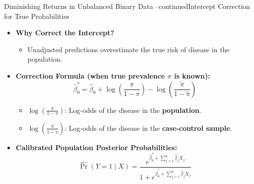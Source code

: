 \documentclass[aspectratio=169, 11pt]{beamer}
\begin{document}
\begin{frame}{Diminishing Returns in Unbalanced Binary Data --continued}{Intercept Correction for True Probabilities}
    \begin{itemize}
        \item \textbf{Why Correct the Intercept?}
        \begin{itemize}
            \item Unadjusted predictions overestimate the true risk of disease in the population.
        \end{itemize}
        \vspace{0.3em}
        \item \textbf{Correction Formula (when true prevalence $\pi$ is known):}
        \[
            \hat{\beta}_{0}^{*} = \hat{\beta}_{0} + \log\left(\frac{\pi}{1-\pi}\right) - \log\left(\frac{\tilde{\pi}}{1-\tilde{\pi}}\right)
        \]
        \begin{itemize}
            \item $\log\left(\frac{\pi}{1-\pi}\right)$: Log-odds of the disease in the \textbf{population}.
            \item $\log\left(\frac{\tilde{\pi}}{1-\tilde{\pi}}\right)$: Log-odds of the disease in the \textbf{case-control sample}.
        \end{itemize}
        \vspace{0.3em}
        \item \textbf{Calibrated Population Posterior Probabilities:}
        \[
            \widehat{\Pr}(Y=1 \mid X) = \frac{e^{\hat{\beta}_{0}^{*} + \sum_{j=1}^p \hat{\beta}_j X_j}}{1 + e^{\hat{\beta}_{0}^{*} + \sum_{j=1}^p \hat{\beta}_j X_j}}
        \]
    \end{itemize}
\end{frame}
\end{document}
